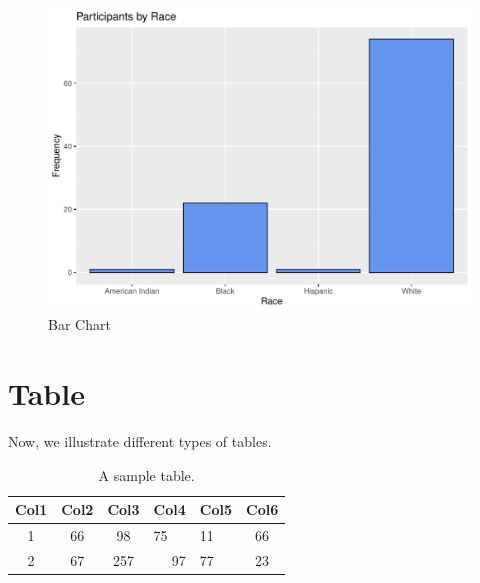\documentclass[11pt]{article}
\begin{document}
\begin{figure}[H]
\centering
\includegraphics[scale=0.8]{R-Plot.pdf}
\caption{Bar Chart}
\label{fig:pie}
\end{figure}

\section{Table}
\label{ref:table}
Now, we illustrate different types of tables.

\begin{table}[!htb]
\centering
\caption{A sample table.}
\begin{tabular}{|c|c|c|m{4cm}|l|c|} %

\hline
Col1 & \textbf{Col2} & Col3 & \multicolumn{1}{c|}{Col4} & Col5 & Col6 \\
\hline
1 & 66 & 98 & 75 & 11 & 66 \\
\hline
2 & 67 & 257 & \multicolumn{1}{r|}{97} & 77 & 23 \\
\hline
\end{tabular}
\end{table}
\end{document}
